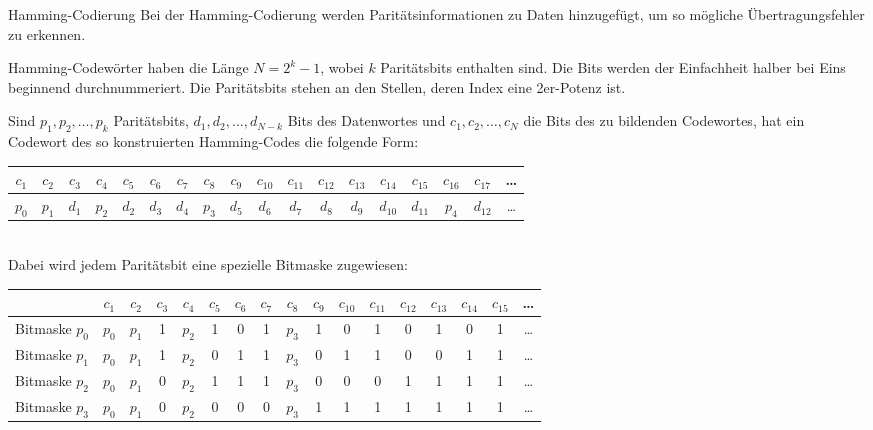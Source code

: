 \documentclass[german]{spicker}
\begin{document}
\begin{defi}{Hamming-Codierung}
    Bei der Hamming-Codierung werden Paritätsinformationen zu Daten hinzugefügt, um so mögliche Übertragungsfehler zu erkennen.

    Hamming-Codewörter haben die Länge $N = 2^k-1$, wobei $k$ Paritätsbits enthalten sind.
    Die Bits werden der Einfachheit halber bei Eins beginnend durchnummeriert.
    Die Paritätsbits stehen an den Stellen, deren Index eine 2er-Potenz ist.

    Sind $p_1, p_2, \ldots, p_k$ Paritätsbits, $d_1, d_2, \ldots, d_{N-k}$ Bits des Datenwortes und $c_1, c_2, \ldots, c_N$ die Bits des zu bildenden Codewortes, hat ein Codewort des so konstruierten Hamming-Codes die folgende Form:

    \begin{tabular}{| c | c | c || c | c | c | c || c | c | c | c | c | c | c | c || c | c | c |}
        \hline
        $c_1$ & $c_2$ & $c_3$ & $c_4$ & $c_5$ & $c_6$ & $c_7$ & $c_8$ & $c_9$ & $c_{10}$ & $c_{11}$ & $c_{12}$ & $c_{13}$ & $c_{14}$ & $c_{15}$ & $c_{16}$ & $c_{17}$ & \ldots \\
        \hline
        $p_0$ & $p_1$ & $d_1$ & $p_2$ & $d_2$ & $d_3$ & $d_4$ & $p_3$ & $d_5$ & $d_6$    & $d_7$    & $d_8$    & $d_9$    & $d_{10}$ & $d_{11}$ & $p_4$    & $d_{12}$ & \ldots \\
        \hline
    \end{tabular}\\

    Dabei wird jedem Paritätsbit eine spezielle Bitmaske zugewiesen:

    \begin{tabular}{| c || c | c | c || c | c | c | c || c | c | c | c | c | c | c | c || c |}
        \hline
                       & $c_1$ & $c_2$ & $c_3$ & $c_4$ & $c_5$ & $c_6$ & $c_7$ & $c_8$ & $c_9$ & $c_{10}$ & $c_{11}$ & $c_{12}$ & $c_{13}$ & $c_{14}$ & $c_{15}$ & \ldots \\
        \hline
        Bitmaske $p_0$ & $p_0$ & $p_1$ & 1     & $p_2$ & 1     & 0     & 1     & $p_3$ & 1     & 0        & 1        & 0        & 1        & 0        & 1        & \ldots \\
        Bitmaske $p_1$ & $p_0$ & $p_1$ & 1     & $p_2$ & 0     & 1     & 1     & $p_3$ & 0     & 1        & 1        & 0        & 0        & 1        & 1        & \ldots \\
        Bitmaske $p_2$ & $p_0$ & $p_1$ & 0     & $p_2$ & 1     & 1     & 1     & $p_3$ & 0     & 0        & 0        & 1        & 1        & 1        & 1        & \ldots \\
        Bitmaske $p_3$ & $p_0$ & $p_1$ & 0     & $p_2$ & 0     & 0     & 0     & $p_3$ & 1     & 1        & 1        & 1        & 1        & 1        & 1        & \ldots \\
        \hline
    \end{tabular}\\


\end{defi}
\end{document}
